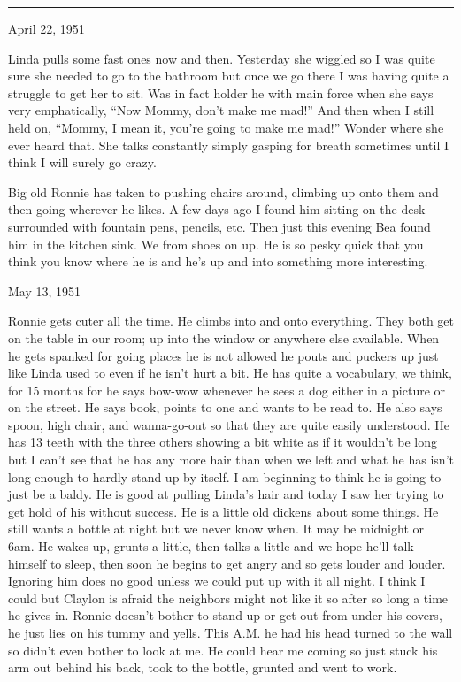 \documentclass[]{book}
\begin{document}
\begin{center}\rule{0.5\linewidth}{\linethickness}\end{center}

April 22, 1951

Linda pulls some fast ones now and then. Yesterday she wiggled so I was quite sure she needed to go to the bathroom but once we go there I was having quite a struggle to get her to sit. Was in fact holder he with main force when she says very emphatically, ``Now Mommy, don't make me mad!'' And then when I still held on, ``Mommy, I mean it, you're going to make me mad!'' Wonder where she ever heard that. She talks constantly simply gasping for breath sometimes until I think I will surely go crazy.

Big old Ronnie has taken to pushing chairs around, climbing up onto them and then going wherever he likes. A few days ago I found him sitting on the desk surrounded with fountain pens, pencils, etc. Then just this evening Bea found him in the kitchen sink. We from shoes on up. He is so pesky quick that you think you know where he is and he's up and into something more interesting.

May 13, 1951

Ronnie gets cuter all the time. He climbs into and onto everything. They both get on the table in our room; up into the window or anywhere else available. When he gets spanked for going places he is not allowed he pouts and puckers up just like Linda used to even if he isn't hurt a bit. He has quite a vocabulary, we think, for 15 months for he says bow-wow whenever he sees a dog either in a picture or on the street. He says book, points to one and wants to be read to. He also says spoon, high chair, and wanna-go-out so that they are quite easily understood. He has 13 teeth with the three others showing a bit white as if it wouldn't be long but I can't see that he has any more hair than when we left and what he has isn't long enough to hardly stand up by itself. I am beginning to think he is going to just be a baldy. He is good at pulling Linda's hair and today I saw her trying to get hold of his without success. He is a little old dickens about some things. He still wants a bottle at night but we never know when. It may be midnight or 6am. He wakes up, grunts a little, then talks a little and we hope he'll talk himself to sleep, then soon he begins to get angry and so gets louder and louder. Ignoring him does no good unless we could put up with it all night. I think I could but Claylon is afraid the neighbors might not like it so after so long a time he gives in. Ronnie doesn't bother to stand up or get out from under his covers, he just lies on his tummy and yells. This A.M. he had his head turned to the wall so didn't even bother to look at me. He could hear me coming so just stuck his arm out behind his back, took to the bottle, grunted and went to work.
\end{document}
